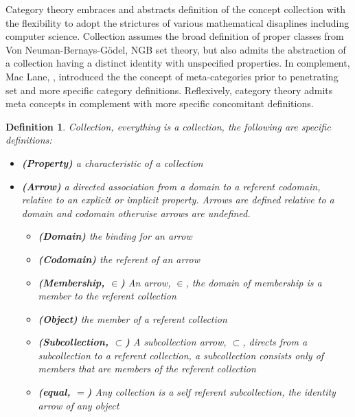 \documentclass[aps,twocolumn,secnumarabic,nobalancelastpage,amsmath,amssymb,
amsthm,nofootinbib,parskip=full]{revtex4}
\numberwithin{equation}{section}
\newtheorem{definition}{Definition}[section]
\begin{document}
Category theory embraces and abstracts definition
of the concept collection with the flexibility to adopt the strictures of
various mathematical disaplines including computer science.
Collection assumes the broad definition of proper classes from
Von Neuman-Bernays-G\"{o}del, NGB set theory,
but also admits the abstraction of a collection having a distinct
identity with unspecified properties. In complement,
Mac Lane, \cite{maclane1998}, introduced the
the concept of meta-categories prior to penetrating set
and more specific category definitions. Reflexively, category
theory admits meta concepts in complement with more specific
concomitant definitions. 

\begin{definition}{Collection}\label{def:collection},
  everything is a collection, the following
  are specific definitions:
  \begin{itemize}
  \item\textbf{(Property)} a characteristic of a collection
  \item\textbf{(Arrow)} a directed association from a domain
    to a referent codomain, relative to an explicit or implicit property.
    Arrows are defined relative to a domain and codomain
    otherwise arrows are undefined.
    \begin{itemize}
    \item\textbf{(Domain)} the binding for an arrow
    \item\textbf{(Codomain)} the referent of an arrow
    \item\textbf{(Membership, $\in$)} An arrow, $\in$, the domain of
      membership is a member to the referent collection
    \item\textbf{(Object)} the member of a referent collection
    \item\textbf{(Subcollection, $\subset$)} A subcollection
      arrow, $\subset$,
      directs from a subcollection to a referent collection,
      a subcollection consists only of members
      that are members of the referent collection
    \item\textbf{(equal, $=$)} Any collection is a
      self referent subcollection,
      the identity arrow of any object
    \end{itemize}
  \end{itemize}
\end{definition}
\end{document}
